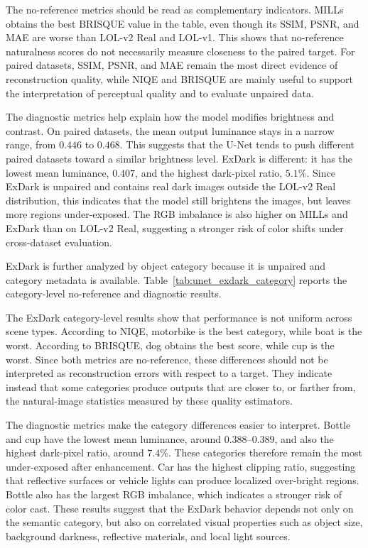The no-reference metrics should be read as complementary indicators. MILLs obtains the best BRISQUE value in the table, even though its SSIM, PSNR, and MAE are worse than LOL-v2 Real and LOL-v1. This shows that no-reference naturalness scores do not necessarily measure closeness to the paired target. For paired datasets, SSIM, PSNR, and MAE remain the most direct evidence of reconstruction quality, while NIQE and BRISQUE are mainly useful to support the interpretation of perceptual quality and to evaluate unpaired data.

The diagnostic metrics help explain how the model modifies brightness and contrast. On paired datasets, the mean output luminance stays in a narrow range, from $0.446$ to $0.468$. This suggests that the U-Net tends to push different paired datasets toward a similar brightness level. ExDark is different: it has the lowest mean luminance, $0.407$, and the highest dark-pixel ratio, $5.1\%$. Since ExDark is unpaired and contains real dark images outside the LOL-v2 Real distribution, this indicates that the model still brightens the images, but leaves more regions under-exposed. The RGB imbalance is also higher on MILLs and ExDark than on LOL-v2 Real, suggesting a stronger risk of color shifts under cross-dataset evaluation.

ExDark is further analyzed by object category because it is unpaired and category metadata is available. Table~\ref{tab:unet_exdark_category} reports the category-level no-reference and diagnostic results.



The ExDark category-level results show that performance is not uniform across scene types. According to NIQE, motorbike is the best category, while boat is the worst. According to BRISQUE, dog obtains the best score, while cup is the worst. Since both metrics are no-reference, these differences should not be interpreted as reconstruction errors with respect to a target. They indicate instead that some categories produce outputs that are closer to, or farther from, the natural-image statistics measured by these quality estimators.

The diagnostic metrics make the category differences easier to interpret. Bottle and cup have the lowest mean luminance, around $0.388$--$0.389$, and also the highest dark-pixel ratio, around $7.4\%$. These categories therefore remain the most under-exposed after enhancement. Car has the highest clipping ratio, suggesting that reflective surfaces or vehicle lights can produce localized over-bright regions. Bottle also has the largest RGB imbalance, which indicates a stronger risk of color cast. These results suggest that the ExDark behavior depends not only on the semantic category, but also on correlated visual properties such as object size, background darkness, reflective materials, and local light sources.

